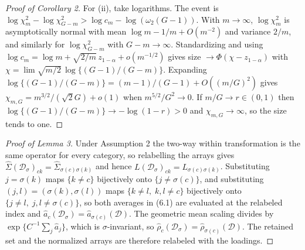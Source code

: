 \documentclass[12pt]{article}
\theoremstyle{definition}
\numberwithin{equation}{section}
\begin{document}
\begin{proof}[Proof of Corollary 2]
For (ii), take logarithms. The event is $\log \chi^2_m - \log \chi^2_{G-m} >
\log c_m - \log(\omega_2(G-1))$. With $m \to \infty$, $\log\chi^2_m$ is
asymptotically normal with mean $\log m - 1/m + O(m^{-2})$ and variance $2/m$,
and similarly for $\log\chi^2_{G-m}$ with $G - m \to \infty$. Standardizing and
using $\log c_m = \log m + \sqrt{2/m}\,z_{1-\alpha} + o(m^{-1/2})$ gives size
$\to \Phi(\chi - z_{1-\alpha})$ with $\chi = \lim \sqrt{m/2}\,\log\{(G-1)/(G-m)\}$.
Expanding $\log\{(G-1)/(G-m)\} = (m-1)/(G-1) + O((m/G)^2)$ gives $\chi_{m,G} =
m^{3/2}/(\sqrt{2}G) + o(1)$ when $m^{5/2}/G^2 \to 0$. If $m/G \to r \in (0,1)$
then $\log\{(G-1)/(G-m)\} \to -\log(1-r) > 0$ and $\chi_{m,G} \to \infty$, so
the size tends to one.
\end{proof}

\begin{proof}[Proof of Lemma 3]
Under Assumption 2 the two-way within transformation is the same
operator for every category, so relabelling the arrays gives
$\hat{\Sigma}(\mathcal{D}_\sigma)_{ck} = \hat{\Sigma}_{\sigma(c)\sigma(k)}$ and
hence $L(\mathcal{D}_\sigma)_{ck} = L_{\sigma(c)\sigma(k)}$. Substituting
$j = \sigma(k)$ maps $\{k \ne c\}$ bijectively onto $\{j \ne \sigma(c)\}$, and
substituting $(j,l) = (\sigma(k),\sigma(l))$ maps $\{k \ne l,\; k,l \ne c\}$
bijectively onto $\{j \ne l,\; j,l \ne \sigma(c)\}$, so both averages in
(6.1) are evaluated at the relabeled index and
$\hat{a}_c(\mathcal{D}_\sigma) = \hat{a}_{\sigma(c)}(\mathcal{D})$. The
geometric mean scaling divides by $\exp\{C^{-1}\sum_j \hat{a}_j\}$, which is
$\sigma$-invariant, so $\hat{\rho}_c(\mathcal{D}_\sigma) =
\hat{\rho}_{\sigma(c)}(\mathcal{D})$. The retained set and the normalized arrays
are therefore relabeled with the loadings.
\end{proof}
\end{document}
